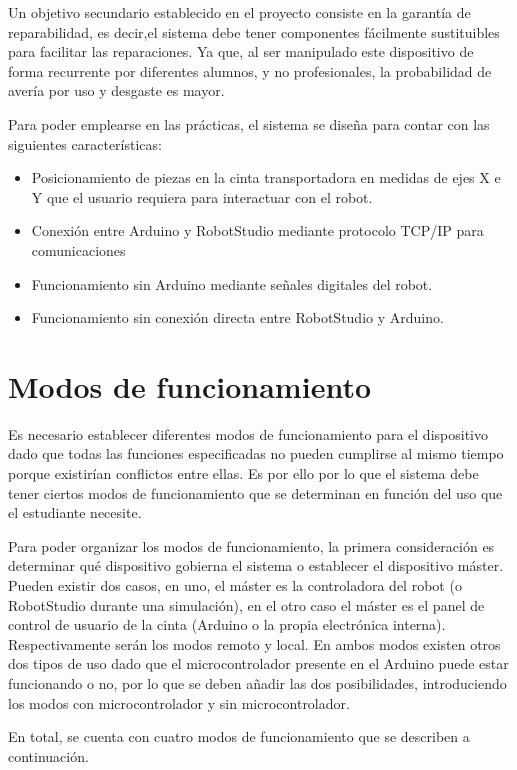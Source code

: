 Un objetivo secundario establecido en el proyecto consiste en la garantía de reparabilidad, es decir,el sistema debe tener componentes fácilmente sustituibles para facilitar las reparaciones. Ya que, al ser manipulado este dispositivo de forma recurrente por diferentes alumnos, y no profesionales, la probabilidad de avería por uso y desgaste es mayor.

Para poder emplearse en las prácticas, el sistema se diseña para contar con las siguientes características:
\begin{itemize}
	\item Posicionamiento de piezas en la cinta transportadora en medidas de ejes X e Y que el usuario requiera para interactuar con el robot.
	\item Conexión entre Arduino y RobotStudio mediante protocolo TCP/IP para comunicaciones
	\item Funcionamiento sin Arduino mediante señales digitales del robot.
	\item Funcionamiento sin conexión directa entre RobotStudio y Arduino.
\end{itemize}

\section{Modos de funcionamiento}\label{sec-00}

Es necesario establecer diferentes modos de funcionamiento para el dispositivo dado que todas las funciones especificadas no pueden cumplirse al mismo tiempo porque existirían conflictos entre ellas. Es por ello por lo que el sistema debe tener ciertos modos de funcionamiento que se determinan en función del uso que el estudiante necesite.

Para poder organizar los modos de funcionamiento, la primera consideración es determinar qué dispositivo gobierna el sistema o  establecer el dispositivo máster. Pueden existir dos casos, en uno,  el máster es la controladora del robot (o RobotStudio durante una simulación), en el otro caso el máster es el panel de control de usuario de la cinta (Arduino o la propia electrónica interna). Respectivamente serán los modos remoto y local.
En ambos modos existen otros dos tipos de uso dado que el microcontrolador presente en el Arduino puede estar funcionando o no, por lo que se deben añadir las dos posibilidades, introduciendo los modos con microcontrolador y sin microcontrolador. 

En total, se cuenta con cuatro modos de funcionamiento que se describen a continuación. 

